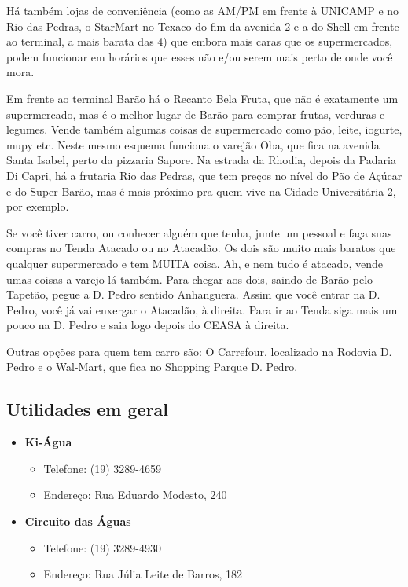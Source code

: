 \documentclass[a4paper,10pt, twocolumn]{article}
\begin{document}
Há também lojas de conveniência (como as AM/PM em frente à UNICAMP e no Rio das
Pedras, o StarMart no Texaco do fim da avenida 2 e a do Shell em frente ao
terminal, a mais barata das 4) que embora mais caras que os supermercados, podem
funcionar em horários que esses não e/ou serem mais perto de onde você mora.

Em frente ao terminal Barão há o Recanto Bela Fruta, que não é exatamente um
supermercado, mas é o melhor lugar de Barão para comprar frutas, verduras
e legumes. Vende também algumas coisas de supermercado como pão, leite, iogurte,
mupy etc. Neste mesmo esquema funciona o varejão Oba, que fica na avenida Santa
Isabel, perto da pizzaria Sapore. Na estrada da Rhodia, depois da Padaria Di
Capri, há a frutaria Rio das Pedras, que tem preços no nível do Pão de Açúcar
e do Super Barão, mas é mais próximo pra quem vive na Cidade Universitária 2,
por exemplo.

Se você tiver carro, ou conhecer alguém que tenha, junte um pessoal e faça suas
compras no Tenda Atacado ou no Atacadão. Os dois são muito mais baratos que
qualquer supermercado e tem MUITA coisa. Ah, e nem tudo é atacado, vende umas
coisas a varejo lá também. Para chegar aos dois, saindo de Barão pelo Tapetão,
pegue a D. Pedro sentido Anhanguera. Assim que você entrar na D. Pedro, você já
vai enxergar o Atacadão, à direita. Para ir ao Tenda siga mais um pouco na D.
Pedro e saia logo depois do CEASA à direita.

Outras opções para quem tem carro são: O Carrefour, localizado na Rodovia D.
Pedro e o Wal-Mart, que fica no Shopping Parque D. Pedro.

\subsection{Utilidades em geral}
\begin{itemize}
\item  \textbf{Ki-Água}
\begin{itemize}
\item  Telefone: (19) 3289-4659
\item  Endereço: Rua Eduardo Modesto, 240
\end{itemize}
\end{itemize}

\begin{itemize}
\item  \textbf{Circuito das Águas}
\begin{itemize}
\item  Telefone: (19) 3289-4930
\item  Endereço: Rua Júlia Leite de Barros, 182
\end{itemize}
\end{itemize}
\end{document}
